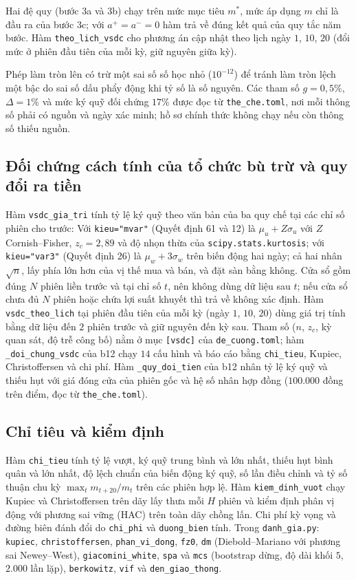 \documentclass[12pt,a4paper]{article}
\theoremstyle{remark}
\newcommand{\ma}[1]{\texttt{\small #1}}
\begin{document}
Hai đệ quy (bước 3a và 3b) chạy trên mức mục tiêu $m^{\ast}$, mức áp dụng $m$ chỉ là đầu ra của bước 3c; với $a^{+}=a^{-}=0$ hàm trả về đúng kết quả của quy tắc năm bước. Hàm \ma{theo\_lich\_vsdc} cho phương án cập nhật theo lịch ngày $1$, $10$, $20$ (đổi mức ở phiên đầu tiên của mỗi kỳ, giữ nguyên giữa kỳ).

Phép làm tròn lên có trừ một sai số số học nhỏ ($10^{-12}$) để tránh làm tròn lệch một bậc do sai số dấu phẩy động khi tỷ số là số nguyên. Các tham số $g=0{,}5\%$, $\Delta=1\%$ và mức ký quỹ đối chứng $17\%$ được đọc từ \ma{the\_che.toml}, nơi mỗi thông số phải có nguồn và ngày xác minh; hồ sơ chính thức không chạy nếu còn thông số thiếu nguồn.

\subsection{Đối chứng cách tính của tổ chức bù trừ và quy đổi ra tiền}

Hàm \ma{vsdc\_gia\_tri} tính tỷ lệ ký quỹ theo văn bản của ba quy chế tại các chỉ số phiên cho trước: Với \ma{kieu="mvar"} (Quyết định 61 và 12) là $\mu_u+Z\sigma_u$ với $Z$ Cornish--Fisher, $z_c=2{,}89$ và độ nhọn thừa của \ma{scipy.stats.kurtosis}; với \ma{kieu="var3"} (Quyết định 26) là $\mu_w+3\sigma_w$ trên biến động hai ngày; cả hai nhân $\sqrt n$, lấy phía lớn hơn của vị thế mua và bán, và đặt sàn bằng không. Cửa sổ gồm đúng $N$ phiên liền trước và tại chỉ số $t$, nên không dùng dữ liệu sau $t$; nếu cửa sổ chưa đủ $N$ phiên hoặc chứa lợi suất khuyết thì trả về không xác định. Hàm \ma{vsdc\_theo\_lich} tại phiên đầu tiên của mỗi kỳ (ngày $1$, $10$, $20$) dùng giá trị tính bằng dữ liệu đến $2$ phiên trước và giữ nguyên đến kỳ sau. Tham số ($n$, $z_c$, kỳ quan sát, độ trễ công bố) nằm ở mục \ma{[vsdc]} của \ma{de\_cuong.toml}; hàm \ma{\_doi\_chung\_vsdc} của b12 chạy $14$ cấu hình và báo cáo bằng \ma{chi\_tieu}, Kupiec, Christoffersen và chi phí. Hàm \ma{\_quy\_doi\_tien} của b12 nhân tỷ lệ ký quỹ và thiếu hụt với giá đóng cửa của phiên gốc và hệ số nhân hợp đồng ($100.000$ đồng trên điểm, đọc từ \ma{the\_che.toml}).

\subsection{Chỉ tiêu và kiểm định}

Hàm \ma{chi\_tieu} tính tỷ lệ vượt, ký quỹ trung bình và lớn nhất, thiếu hụt bình quân và lớn nhất, độ lệch chuẩn của biến động ký quỹ, số lần điều chỉnh và tỷ số thuận chu kỳ $\max_t m_{t+20}/m_t$ trên các phiên hợp lệ. Hàm \ma{kiem\_dinh\_vuot} chạy Kupiec và Christoffersen trên dãy lấy thưa mỗi $H$ phiên và kiểm định phân vị động với phương sai vững (HAC) trên toàn dãy chồng lấn. Chi phí kỳ vọng và đường biên đánh đổi do \ma{chi\_phi} và \ma{duong\_bien} tính. Trong \ma{danh\_gia.py}: \ma{kupiec}, \ma{christoffersen}, \ma{phan\_vi\_dong}, \ma{fz0}, \ma{dm} (Diebold--Mariano với phương sai Newey--West), \ma{giacomini\_white}, \ma{spa} và \ma{mcs} (bootstrap dừng, độ dài khối $5$, $2.000$ lần lặp), \ma{berkowitz}, \ma{vif} và \ma{den\_giao\_thong}.
\end{document}
